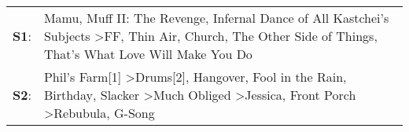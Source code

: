 \begin{supertabular}{p{0.03\textwidth}p{0.92\textwidth}}
 \textbf{S1}:  &                                                                                            Mamu\textsuperscript{}, \enspace Muff II: The Revenge\textsuperscript{}, \enspace Infernal Dance of All Kastchei's Subjects\textsuperscript{} \textgreater \enspace FF\textsuperscript{}, \enspace Thin Air\textsuperscript{}, \enspace Church\textsuperscript{}, \enspace The Other Side of Things\textsuperscript{}, \enspace That's What Love Will Make You Do\textsuperscript{}  \enspace  \\
 \textbf{S2}:  &  Phil's Farm[1]\textsuperscript{} \textgreater \enspace Drums[2]\textsuperscript{}, \enspace Hangover\textsuperscript{}, \enspace Fool in the Rain\textsuperscript{}, \enspace Birthday\textsuperscript{}, \enspace Slacker\textsuperscript{} \textgreater \enspace Much Obliged\textsuperscript{} \textgreater \enspace Jessica\textsuperscript{}, \enspace Front Porch\textsuperscript{} \textgreater \enspace Rebubula\textsuperscript{}, \enspace G-Song\textsuperscript{}  \enspace  \\
\end{supertabular}
